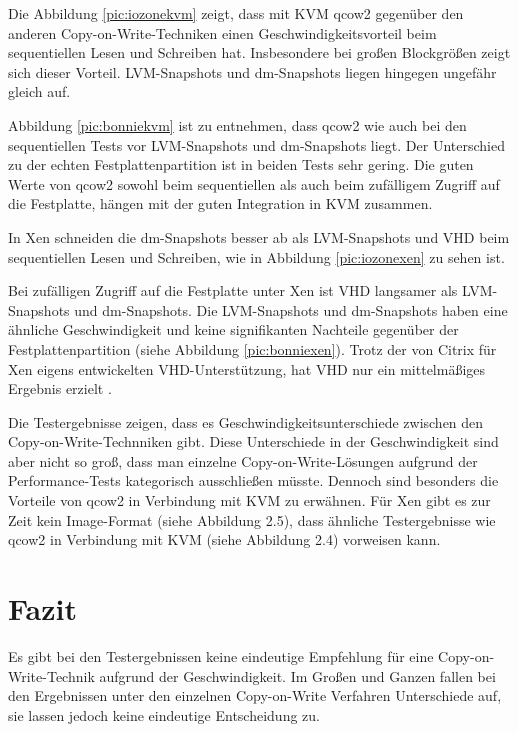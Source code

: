Die Abbildung \ref{pic:iozonekvm} zeigt, dass mit KVM qcow2 gegenüber den anderen Copy-on-Write-Techniken einen Geschwindigkeitsvorteil beim sequentiellen Lesen und Schreiben hat. Insbesondere bei großen Blockgrößen zeigt sich dieser Vorteil. LVM-Snapshots und dm-Snapshots liegen hingegen ungefähr gleich auf.

Abbildung \ref{pic:bonniekvm} ist zu entnehmen, dass qcow2 wie auch bei den sequentiellen Tests vor LVM-Snapshots und dm-Snapshots liegt. Der Unterschied zu der echten Festplattenpartition ist in beiden Tests sehr gering. Die guten Werte von qcow2 sowohl beim sequentiellen als auch beim zufälligem Zugriff auf die Festplatte, hängen mit der guten Integration in KVM zusammen.

In Xen schneiden die dm-Snapshots besser ab als LVM-Snapshots und VHD beim sequentiellen Lesen und Schreiben, wie in Abbildung \ref{pic:iozonexen} zu sehen ist. 

Bei zufälligen Zugriff auf die Festplatte unter Xen ist VHD langsamer als LVM-Snapshots und dm-Snapshots. Die LVM-Snapshots und dm-Snapshots haben eine ähnliche Geschwindigkeit und keine signifikanten Nachteile gegenüber der Festplattenpartition (siehe Abbildung \ref{pic:bonniexen}). Trotz der von Citrix für Xen eigens entwickelten VHD-Unterstützung, hat VHD nur ein mittelmäßiges Ergebnis erzielt \cite{citrixVHD}. 

Die Testergebnisse zeigen, dass es Geschwindigkeitsunterschiede zwischen den Copy-on-Write-Technniken gibt. Diese Unterschiede in der Geschwindigkeit sind aber nicht so groß, dass man einzelne Copy-on-Write-Lösungen aufgrund der Performance-Tests kategorisch ausschließen müsste. Dennoch sind besonders die Vorteile von qcow2 in Verbindung mit KVM zu erwähnen. Für Xen gibt es zur Zeit kein Image-Format (siehe Abbildung 2.5), dass ähnliche Testergebnisse wie qcow2 in Verbindung mit KVM (siehe Abbildung 2.4) vorweisen kann. 

\section{Fazit}
Es gibt bei den Testergebnissen keine eindeutige Empfehlung für eine Copy-on-Write-Technik aufgrund der Geschwindigkeit. Im Großen und Ganzen fallen bei den Ergebnissen unter den einzelnen Copy-on-Write Verfahren Unterschiede auf, sie lassen jedoch keine eindeutige Entscheidung zu.

